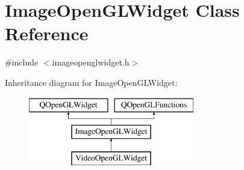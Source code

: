 \hypertarget{class_image_open_g_l_widget}{}\section{Image\+Open\+G\+L\+Widget Class Reference}
\label{class_image_open_g_l_widget}


{\ttfamily \#include $<$imageopenglwidget.\+h$>$}

Inheritance diagram for Image\+Open\+G\+L\+Widget\+:\begin{figure}[H]
\begin{center}
\leavevmode
\includegraphics[height=3.000000cm]{class_image_open_g_l_widget}
\end{center}
\end{figure}
